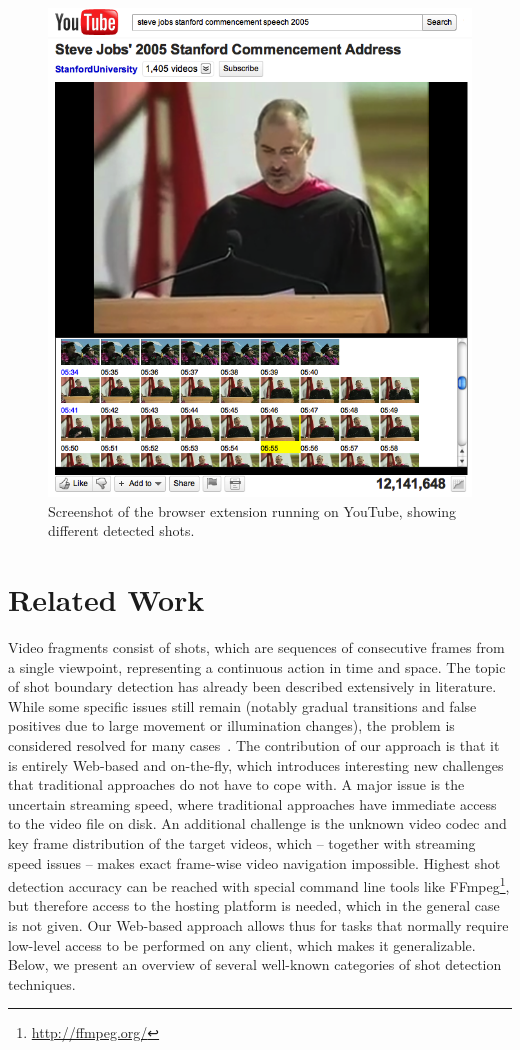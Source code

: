 \documentclass{acm_proc_article-sp}
\newcommand{\inlinelistingsize}{\fontsize{8pt}{11pt}}
\let\oldurl\url
\renewcommand{\url}[1]{\inlinelistingsize\oldurl{#1}}
\begin{document}
\begin{figure}
\begin{center}
   \includegraphics[width=0.85\linewidth]{./resources/stevejobs.png}
\end{center}
   \caption{Screenshot of the browser extension running on YouTube, showing different detected shots.}
\label{fig:screenshot}
\end{figure}

\section{Related Work} \label{sec:related-work}
Video fragments consist of shots, which are sequences of consecutive frames from a single viewpoint, representing a continuous action in time and space. The topic of shot boundary detection has already been described extensively in literature. While some specific issues still remain (notably gradual transitions and false positives due to large movement or illumination changes), the problem is considered resolved for many cases~\cite{Hanjalic2002, Yuan2007}. The contribution of our approach is that it is entirely Web-based and on-the-fly, which introduces interesting new challenges that traditional approaches do not have to cope with. A major issue is the uncertain streaming speed, where traditional approaches have immediate access to the video file on disk. An additional challenge is the unknown video codec and key frame distribution of the target videos, which -- together with streaming speed issues -- makes exact frame-wise video navigation impossible. Highest shot detection accuracy can be reached with special command line tools like FFmpeg\footnote{\url{http://ffmpeg.org/}}, but therefore access to the hosting platform is needed, which in the general case is not given. Our Web-based approach allows thus for tasks that normally require low-level access to be performed on any client, which makes it generalizable. Below, we present an overview of several well-known categories of shot detection techniques.
\end{document}
